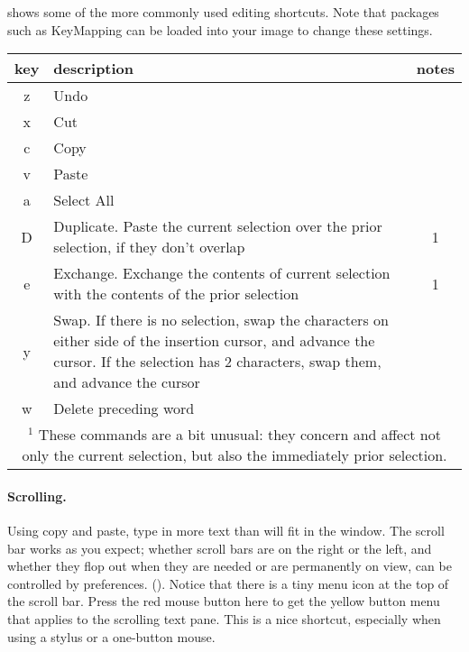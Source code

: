 \documentclass[a4paper,10pt,twoside]{book}
\begin{document}
 shows some of the more commonly used editing shortcuts. Note that packages such as KeyMapping can be loaded into your image to change these settings.


\begin{table}[htbp]
   \centering
   \begin{tabular}{cp{5in}c} 			%
      \toprule
      key    & description & notes\\
      \midrule
      z      & Undo &  \\
      x      & Cut    &  \\
      c      & Copy  &  \\
      v      & Paste  &  \\
      a      & Select All  &  \\
      D      & Duplicate.  Paste the current selection over the prior selection, if they don't overlap & 1 \\
      e      & Exchange. Exchange the contents of current selection with the contents of the prior selection & 1 \\
      y      & Swap. If there is no selection, swap the characters on either side of the insertion cursor, and advance the cursor. If the selection has 2 characters, swap them, and advance the cursor &  \\
      w     & Delete preceding word   &   \\
      \midrule
      \multicolumn{3}{p{6in}}{${}^{1}$ These commands are a bit unusual: they concern and affect not only the current selection, but also the immediately prior selection.} \\
      \bottomrule
   \end{tabular}
\end{table}


\paragraph{Scrolling.} Using copy and paste, type in more text than will fit in the window. The scroll bar works as you expect; whether scroll bars are on the right or the left, and whether they flop out when they are needed or are permanently on view, can be controlled by preferences. ().
Notice that there is a tiny menu icon at the top of the scroll bar. Press the red mouse button here to get the yellow button menu that applies to the scrolling text pane. This is a nice shortcut, especially when using a stylus or a one-button mouse.
\end{document}
